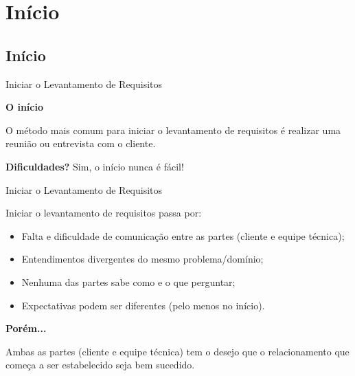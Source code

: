 \documentclass[xcolor=x11names,compress]{beamer}
\begin{document}
\section{Início}
\subsection{Início}

\begin{frame}{Iniciar o Levantamento de Requisitos}

\begin{alertblock}{\textbf{O início}}

O método mais comum para iniciar o levantamento de requisitos é realizar uma reunião ou entrevista com o cliente. 

\end{alertblock}

\pause

\begin{alertblock}{\textbf{Dificuldades?}}
Sim, o início nunca é fácil!
\end{alertblock}

\end{frame}

\begin{frame}{Iniciar o Levantamento de Requisitos}

Iniciar o levantamento de requisitos passa por:

\begin{itemize}
\itemsep 5mm

\item Falta e dificuldade de comunicação entre as partes (cliente e equipe técnica);

\item Entendimentos divergentes do mesmo problema/domínio;

\item Nenhuma das partes sabe como e o que perguntar;

\item Expectativas podem ser diferentes (pelo menos no início).

\end{itemize}

\pause

\begin{alertblock}{\centering \textbf{Porém...}}

Ambas as partes (cliente e equipe técnica) tem o desejo que o relacionamento que começa a ser estabelecido seja bem sucedido.
\end{alertblock}

\end{frame}
\end{document}
